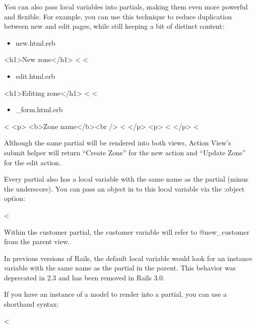 \documentclass[10pt]{book}
\newenvironment{code}{%
  \scriptsize
    \verbatim
}{%
    \endverbatim
    \newline
}
\begin{document}
You can also pass local variables into partials, making them even  more powerful and flexible. For example, you can use this technique to  reduce duplication between new and edit pages, while still keeping a bit  of distinct content:
\begin{itemize}
	\item new.html.erb
\end{itemize}
\begin{code}
<h1>New zone</h1>
<%
<%
\end{code}
\begin{itemize}
	\item edit.html.erb
\end{itemize}
\begin{code}
<h1>Editing zone</h1>
<%
<%
\end{code}
\begin{itemize}
	\item \_form.html.erb
\end{itemize}
\begin{code}
<%
  <p>
    <b>Zone name</b><br />
    <%
  </p>
  <p>
    <%
  </p>
<%
\end{code}

Although the same partial will be rendered into both views, Action  View’s submit helper will return “Create Zone” for the new action and  “Update Zone” for the edit action.

Every partial also has a local variable with the same name as the  partial (minus the underscore). You can pass an object in to this local  variable via the :object option:
\begin{code}
<%
\end{code}

Within the customer partial, the customer variable will refer to @new\_customer from the parent view.

In previous versions of Rails, the default local  variable would look for an instance variable with the same name as the  partial in the parent. This behavior was deprecated in 2.3 and has been  removed in Rails 3.0.

If you have an instance of a model to render into a partial, you can use a shorthand syntax:
\begin{code}
<%
\end{code}
\end{document}
